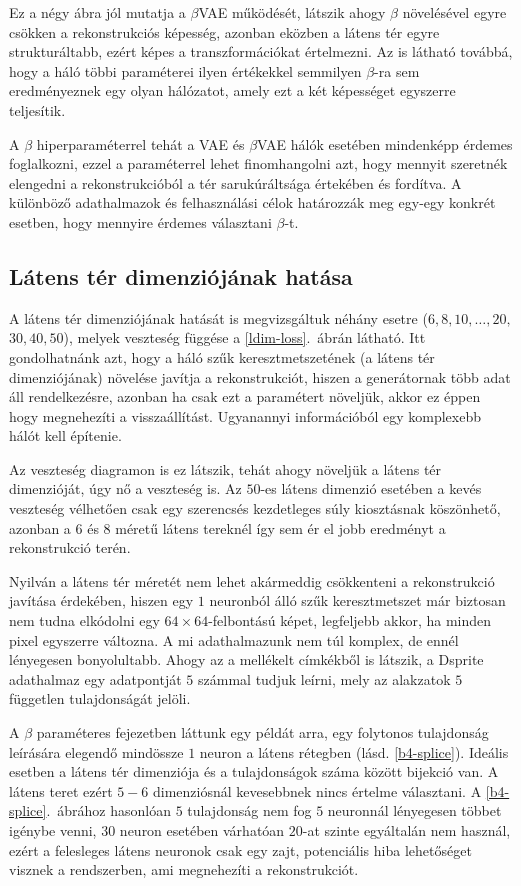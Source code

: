 Ez a négy ábra jól mutatja a $\beta$VAE működését, látszik ahogy $\beta$ növelésével egyre csökken a rekonstrukciós képesség, azonban eközben a látens tér egyre strukturáltabb, ezért képes a transzformációkat értelmezni. Az is látható továbbá, hogy a háló többi paraméterei ilyen értékekkel semmilyen $\beta$-ra sem eredményeznek egy olyan hálózatot, amely ezt a két képességet egyszerre teljesítik.



A $\beta$ hiperparaméterrel tehát a VAE és $\beta$VAE hálók esetében mindenképp érdemes foglalkozni, ezzel a paraméterrel lehet finomhangolni azt, hogy mennyit szeretnék elengedni a rekonstrukcióból a tér sarukúráltsága értekében és fordítva. A különböző adathalmazok és felhasználási célok határozzák meg egy-egy konkrét esetben, hogy mennyire érdemes választani $\beta$-t.

\subsection{Látens tér dimenziójának hatása}

A látens tér dimenziójának hatását is megvizsgáltuk néhány esetre ($6, 8, 10, \dots , 20,$ $30, 40, 50$), melyek veszteség függése a \ref{ldim-loss}.~ábrán látható. Itt gondolhatnánk azt, hogy a háló szűk keresztmetszetének (a látens tér dimenziójának) növelése javítja a rekonstrukciót, hiszen a generátornak több adat áll rendelkezésre, azonban ha csak ezt a paramétert növeljük, akkor ez éppen hogy megnehezíti a visszaállítást. Ugyanannyi információból egy komplexebb hálót kell építenie.

Az veszteség diagramon is ez látszik, tehát ahogy növeljük a látens tér dimenzióját, úgy nő a veszteség is. Az $50$-es látens dimenzió esetében a kevés veszteség vélhetően csak egy szerencsés kezdetleges súly kiosztásnak köszönhető, azonban a $6$ és $8$ méretű látens tereknél így sem ér el jobb eredményt a rekonstrukció terén. 

Nyilván a látens tér méretét nem lehet akármeddig csökkenteni a rekonstrukció javítása érdekében, hiszen egy $1$ neuronból álló szűk keresztmetszet már biztosan nem tudna elkódolni egy $64\times64$-felbontású képet, legfeljebb akkor, ha minden pixel egyszerre változna. A mi adathalmazunk nem túl komplex, de ennél lényegesen bonyolultabb. Ahogy az a mellékelt címkékből is látszik, a Dsprite adathalmaz egy adatpontját $5$ számmal tudjuk leírni, mely az alakzatok $5$ független tulajdonságát jelöli.

A $\beta$ paraméteres fejezetben láttunk egy példát arra, egy folytonos tulajdonság leírására elegendő mindössze $1$ neuron a látens rétegben (lásd. \ref{b4-splice}). Ideális esetben a látens tér dimenziója és a tulajdonságok száma között bijekció van. A látens teret ezért $5-6$ dimenziósnál kevesebbnek nincs értelme választani. A \ref{b4-splice}.~ábrához hasonlóan $5$ tulajdonság nem fog $5$ neuronnál lényegesen többet igénybe venni, $30$ neuron esetében várhatóan $20$-at szinte egyáltalán nem használ, ezért a felesleges látens neuronok csak egy zajt, potenciális hiba lehetőséget visznek a rendszerben, ami megnehezíti a rekonstrukciót.

